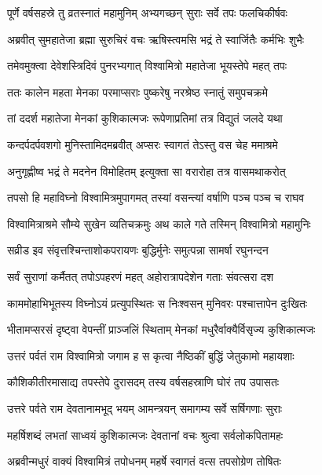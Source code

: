 
\twolineshloka
{पूर्णे वर्षसहस्रे तु व्रतस्नातं महामुनिम्}
{अभ्यगच्छन् सुराः सर्वे तपः फलचिकीर्षवः} %

\twolineshloka
{अब्रवीत् सुमहातेजा ब्रह्मा सुरुचिरं वचः}
{ऋषिस्त्वमसि भद्रं ते स्वार्जितैः कर्मभिः शुभैः} %

\twolineshloka
{तमेवमुक्त्वा देवेशस्त्रिदिवं पुनरभ्यगात्}
{विश्वामित्रो महातेजा भूयस्तेपे महत् तपः} %

\twolineshloka
{ततः कालेन महता मेनका परमाप्सराः}
{पुष्करेषु नरश्रेष्ठ स्नातुं समुपचक्रमे} %

\twolineshloka
{तां ददर्श महातेजा मेनकां कुशिकात्मजः}
{रूपेणाप्रतिमां तत्र विद्युतं जलदे यथा} %

\twolineshloka
{कन्दर्पदर्पवशगो मुनिस्तामिदमब्रवीत्}
{अप्सरः स्वागतं तेऽस्तु वस चेह ममाश्रमे} %

\twolineshloka
{अनुगृह्णीष्व भद्रं ते मदनेन विमोहितम्}
{इत्युक्ता सा वरारोहा तत्र वासमथाकरोत्} %

\twolineshloka
{तपसो हि महाविघ्नो विश्वामित्रमुपागमत्}
{तस्यां वसन्त्यां वर्षाणि पञ्च पञ्च च राघव} %

\twolineshloka
{विश्वामित्राश्रमे सौम्ये सुखेन व्यतिचक्रमुः}
{अथ काले गते तस्मिन् विश्वामित्रो महामुनिः} %

\twolineshloka
{सव्रीड इव संवृत्तश्चिन्ताशोकपरायणः}
{बुद्धिर्मुनेः समुत्पन्ना सामर्षा रघुनन्दन} %

\twolineshloka
{सर्वं सुराणां कर्मैतत् तपोऽपहरणं महत्}
{अहोरात्रापदेशेन गताः संवत्सरा दश} %

\twolineshloka
{काममोहाभिभूतस्य विघ्नोऽयं प्रत्युपस्थितः}
{स निःश्वसन् मुनिवरः पश्चात्तापेन दुःखितः} %

\twolineshloka
{भीतामप्सरसं दृष्ट्वा वेपन्तीं प्राञ्जलिं स्थिताम्}
{मेनकां मधुरैर्वाक्यैर्विसृज्य कुशिकात्मजः} %

\twolineshloka
{उत्तरं पर्वतं राम विश्वामित्रो जगाम ह}
{स कृत्वा नैष्ठिकीं बुद्धिं जेतुकामो महायशाः} %

\twolineshloka
{कौशिकीतीरमासाद्य तपस्तेपे दुरासदम्}
{तस्य वर्षसहस्राणि घोरं तप उपासतः} %

\twolineshloka
{उत्तरे पर्वते राम देवतानामभूद् भयम्}
{आमन्त्रयन् समागम्य सर्वे सर्षिगणाः सुराः} %

\twolineshloka
{महर्षिशब्दं लभतां साध्वयं कुशिकात्मजः}
{देवतानां वचः श्रुत्वा सर्वलोकपितामहः} %

\twolineshloka
{अब्रवीन्मधुरं वाक्यं विश्वामित्रं तपोधनम्}
{महर्षे स्वागतं वत्स तपसोग्रेण तोषितः} %

